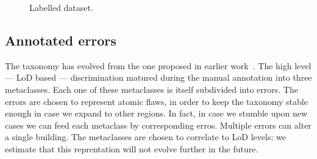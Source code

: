 \documentclass[../main.tex]{subfiles}
\begin{document}
    \begin{figure}[H]
        {
            \caption{\label{fig::dataset} Labelled dataset.}
        }
    \end{figure}

    \subsection{Annotated errors}

    The taxonomy has evolved from the one proposed in earlier work~\cite{michelin2013quality}. The high level --- LoD based --- discrimination matured during the manual annotation into three metaclasses. Each one of these metaclasses is itself subdivided into errors. The errors are chosen to represent atomic flaws, in order to keep the taxonomy stable enough in case we expand to other regions. In fact, in case we stumble upon new cases we can feed each metaclass by corresponding erros. Multiple errors can alter a single building. The metaclasses are chosen to correlate to LoD levels: we estimate that this reprentation will not evolve further in the future.
\end{document}
